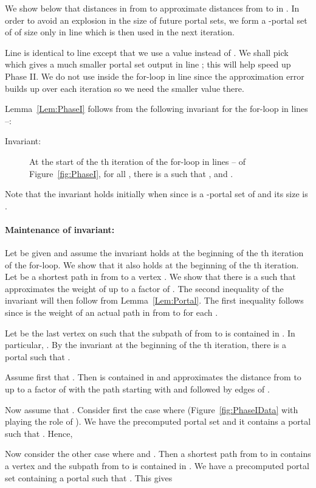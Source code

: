 \documentclass[11pt]{article}
\begin{document}
We show below that distances in  from  to  approximate distances from  to  in . In order to avoid an explosion in the size of future portal sets, we form a -portal set  of  of size only  in line  which is then used in the next iteration.

Line  is identical to line  except that we use a value  instead of . We shall pick  which gives a much smaller portal set  output in line ; this will help speed up Phase II. We do not use  inside the for-loop in line  since the approximation error builds up over each iteration so we need the smaller value  there.

Lemma~\ref{Lem:PhaseI} follows from the following invariant for the for-loop in lines --:
\begin{description}
\item[Invariant:] At the start of the th iteration of the for-loop in lines -- of Figure~\ref{fig:PhaseI}, for all , there is a  such that , and .
\end{description}

Note that the invariant holds initially when  since  is a -portal set of  and its size is .

\paragraph{Maintenance of invariant:} Let  be given and assume the invariant holds at the beginning of the th iteration of the for-loop. We show that it also holds at the beginning of the th iteration. Let  be a shortest path in  from  to a vertex . We show that there is a  such that  approximates the weight of  up to a factor of . The second inequality of the invariant will then follow from Lemma~\ref{Lem:Portal}. The first inequality follows since  is the weight of an actual path in  from  to  for each .

Let  be the last vertex on  such that the subpath of  from  to  is contained in . In particular, . By the invariant at the beginning of the th iteration, there is a portal  such that .

Assume first that . Then  is contained in  and  approximates the distance from  to  up to a factor of  with the path starting with  and followed by edges of .

Now assume that . Consider first the case where
 (Figure~\ref{fig:PhaseIData} with  playing the role of ). We have the precomputed portal set  and it contains a portal  such that . Hence,


Now consider the other case where  and . Then a shortest path from  to  in  contains a vertex  and the subpath from  to  is contained in . We have a precomputed portal set  containing a portal  such that . This gives
\end{document}
